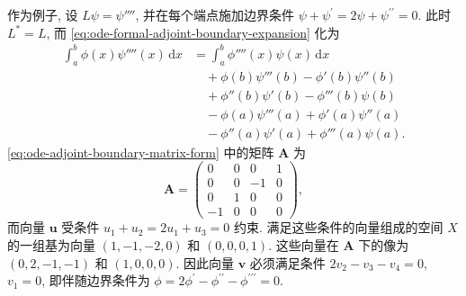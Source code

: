 作为例子, 设 $L\psi=\psi''''$, 并在每个端点施加边界条件 $\psi+\psi^{\prime}=2\psi+\psi^{\prime\prime}=0$. 此时 $L^*=L$, 而 \eqref{eq:ode-formal-adjoint-boundary-expansion} 化为
\begin{equation}\label{eq:fourth-order-ode-green-identity}
\begin{aligned}
\int_a^b\phi(x)\psi''''(x)\,\mathrm{d}x
&=\int_a^b\phi''''(x)\psi(x)\,\mathrm{d}x\\
&\quad+\phi(b)\psi'''(b)-\phi'(b)\psi''(b)\\
&\quad+\phi''(b)\psi'(b)-\phi'''(b)\psi(b)\\
&\quad-\phi(a)\psi'''(a)+\phi'(a)\psi''(a)\\
&\quad-\phi''(a)\psi'(a)+\phi'''(a)\psi(a).
\end{aligned}
\end{equation}
\eqref{eq:ode-adjoint-boundary-matrix-form} 中的矩阵 $\bm{A}$ 为
\begin{equation}\label{eq:fourth-order-ode-boundary-matrix}
\bm{A}=\begin{pmatrix}0&0&0&1\\0&0&-1&0\\0&1&0&0\\-1&0&0&0\end{pmatrix},
\end{equation}
而向量 $\bm{u}$ 受条件 $u_1+u_2=2u_1+u_3=0$ 约束. 满足这些条件的向量组成的空间 $X$ 的一组基为向量 $(1,-1,-2,0)$ 和 $(0,0,0,1)$. 这些向量在 $\bm{A}$ 下的像为 $(0,2,-1,-1)$ 和 $(1,0,0,0)$. 因此向量 $\bm{v}$ 必须满足条件 $2v_2-v_3-v_4=0$, $v_1=0$, 即伴随边界条件为 $\phi=2\phi^{\prime}-\phi^{\prime\prime}-\phi^{\prime\prime\prime}=0$.
